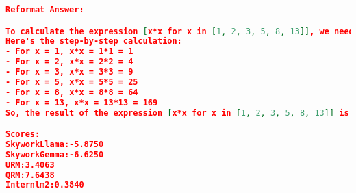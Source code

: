 \begin{lstlisting}[language=json,numbers=none]
Reformat Answer:

To calculate the expression [x*x for x in [1, 2, 3, 5, 8, 13]], we need to square each number in the list.
Here's the step-by-step calculation:
- For x = 1, x*x = 1*1 = 1
- For x = 2, x*x = 2*2 = 4
- For x = 3, x*x = 3*3 = 9
- For x = 5, x*x = 5*5 = 25
- For x = 8, x*x = 8*8 = 64
- For x = 13, x*x = 13*13 = 169
So, the result of the expression [x*x for x in [1, 2, 3, 5, 8, 13]] is [1, 4, 9, 25, 64, 169].

Scores:
SkyworkLlama:-5.8750
SkyworkGemma:-6.6250
URM:3.4063
QRM:7.6438
Internlm2:0.3840
\end{lstlisting}